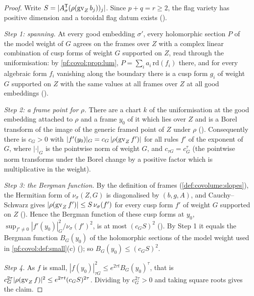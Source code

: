 \begin{proof}
Write $S=|A_\sigma^{\mathsf T}(\rho(\operatorname{gv}_Zb_j))_j|$. Since $p+q=r\ge2$, the flag variety has positive
dimension and a toroidal flag datum exists ().

\emph{Step 1: spanning.} At every good embedding $\sigma'$, every holomorphic section $P$ of the model weight
of $G$ agrees on the frames over $Z$ with a complex linear combination of cusp forms of weight $G$ supported
on $Z$, read through the uniformisation: by \cref{pf:covol:prop:lum}, $P=\sum_ia_i\,\mathrm{rd}(f_i)$ there,
and for every algebraic form $f_i$ vanishing along the boundary there is a cusp form $g_i$ of weight $G$
supported on $Z$ with the same values at all frames over $Z$ at all good embeddings
().

\emph{Step 2: a frame point for $\rho$.} There are a chart $k$ of the uniformisation at the good embedding
attached to $\rho$ and a frame $y_0$ of it which lies over $Z$ and is a Borel transform of the image of the
generic framed point of $Z$ under $\rho$ (). Consequently there
is $c_G>0$ with $|f'(y_0)|_G=c_G\,|\rho(\operatorname{gv}_Zf')|$ for all rules $f'$ of the exponent of $G$, where
$|\cdot|_G$ is the pointwise norm of weight $G$, and $c_{\tau G}=c_G^\tau$ (the pointwise norm transforms
under the Borel change by a positive factor which is multiplicative in the weight).

\emph{Step 3: the Bergman function.} By the definition of frames (\cref{def:covolume:slopes}), the Hermitian
form of $\nu_\sigma(Z,G)$ is diagonalised by $(b,g,A)$, and Cauchy--Schwarz gives
$|\rho(\operatorname{gv}_Zf')|\le S\,\nu_\sigma(f')$ for every cusp form $f'$ of weight $G$ supported on $Z$
(). Hence the Bergman function of these cusp forms at $y_0$,
$\sup_{f'\ne0}|f'(y_0)|_G^2/\nu_\sigma(f')^2$, is at most $(c_GS)^2$
(). By Step 1 it equals the Bergman function $B_G(y_0)$ of
the holomorphic sections of the model weight used in \cref{pf:covol:def:small}(c)
(); so $B_G(y_0)\le(c_GS)^2$.

\emph{Step 4.} As $f$ is small, $|f(y_0)|_{\tau G}^2\le e^{2\tau t}B_G(y_0)^\tau$, that is
$c_G^{2\tau}|\rho(\operatorname{gv}_Zf)|^2\le e^{2\tau t}(c_GS)^{2\tau}$. Dividing by $c_G^{2\tau}>0$ and taking
square roots gives the claim.
\end{proof}

